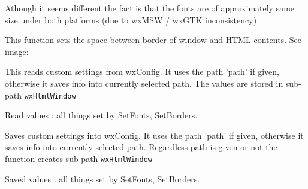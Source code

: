 Athough it seems different the fact is that the fonts are of approximately
same size under both platforms (due to wxMSW / wxGTK inconsistency)


\label{wxhtmlwindowsetborders}


This function sets the space between border of window and HTML contents. See image:





\label{wxhtmlwindowreadcustomization}


This reads custom settings from wxConfig. It uses the path 'path'
if given, otherwise it saves info into currently selected path.
The values are stored in sub-path {\tt wxHtmlWindow}

Read values : all things set by SetFonts, SetBorders.





\label{wxhtmlwindowwritecustomization}


Saves custom settings into wxConfig. It uses the path 'path'
if given, otherwise it saves info into currently selected path.
Regardless path is given or not the function creates sub-path
{\tt wxHtmlWindow}

Saved values : all things set by SetFonts, SetBorders.





\label{wxhtmlwindowgetinternalrepresentation}

